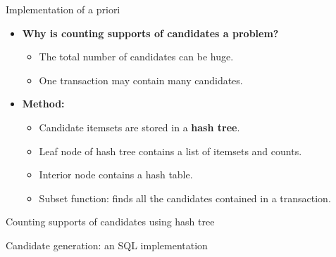 \documentclass[aspectratio=169,t]{beamer}
\begin{document}
  {
    \begin{frame}{Implementation of a priori}
    \begin{itemize}
      \item \textbf{Why is counting supports of candidates a problem?}
      \begin{itemize}
        \item The total number of candidates can be huge.
        \item One transaction may contain many candidates.
      \end{itemize}
      \item \textbf{Method:}
      \begin{itemize}
        \item Candidate itemsets are stored in a \textbf{hash tree}.
        \item Leaf node of hash tree contains a list of itemsets and counts.
        \item Interior node contains a hash table.
        \item Subset function: finds all the candidates contained in a transaction.
      \end{itemize}
    \end{itemize}    
    \end{frame}
  }

  {
    \begin{frame}{Counting supports of candidates using hash tree}

    \end{frame}
  }

  {
    \begin{frame}{Candidate generation: an SQL implementation}

    \end{frame}
  }
\end{document}
